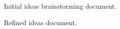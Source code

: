 \documentclass{article}
\begin{document}
\begin{figure}[H]
  \centering
  \caption{Initial ideas brainstorming document.}\label{initial-ideas}
\end{figure}

\begin{figure}[H]
  \centering
  \caption{Refined ideas document.}\label{refined-ideas}
\end{figure}
\end{document}
